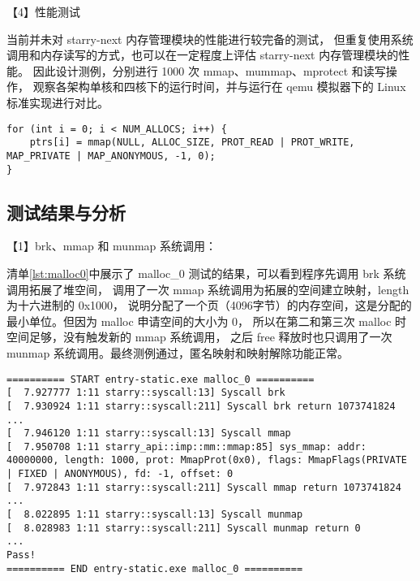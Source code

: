 【4】性能测试



当前并未对 starry-next 内存管理模块的性能进行较完备的测试，
但重复使用系统调用和内存读写的方式，也可以在一定程度上评估 starry-next 内存管理模块的性能。
因此设计测例，分别进行 1000 次 mmap、mummap、mprotect 和读写操作，
观察各架构单核和四核下的运行时间，并与运行在 qemu 模拟器下的 Linux 标准实现进行对比。

\begin{lstlisting}[caption=性能测试测例的部分代码]
for (int i = 0; i < NUM_ALLOCS; i++) {
    ptrs[i] = mmap(NULL, ALLOC_SIZE, PROT_READ | PROT_WRITE, MAP_PRIVATE | MAP_ANONYMOUS, -1, 0);
}
\end{lstlisting}

\subsection{测试结果与分析}

【1】brk、mmap 和 munmap 系统调用：

清单\ref{lst:malloc0}中展示了 malloc\_0 测试的结果，可以看到程序先调用 brk 系统调用拓展了堆空间，
调用了一次 mmap 系统调用为拓展的空间建立映射，length 为十六进制的 0x1000，
说明分配了一个页（4096字节）的内存空间，这是分配的最小单位。但因为 malloc 申请空间的大小为 0，
所以在第二和第三次 malloc 时空间足够，没有触发新的 mmap 系统调用，
之后 free 释放时也只调用了一次 munmap 系统调用。最终测例通过，匿名映射和映射解除功能正常。

\begin{lstlisting}[caption=运行 malloc\_0 测例的部分输出（info 级信息）, label=lst:malloc0]
========== START entry-static.exe malloc_0 ==========
[  7.927777 1:11 starry::syscall:13] Syscall brk
[  7.930924 1:11 starry::syscall:211] Syscall brk return 1073741824
...
[  7.946120 1:11 starry::syscall:13] Syscall mmap
[  7.950708 1:11 starry_api::imp::mm::mmap:85] sys_mmap: addr: 40000000, length: 1000, prot: MmapProt(0x0), flags: MmapFlags(PRIVATE | FIXED | ANONYMOUS), fd: -1, offset: 0
[  7.972843 1:11 starry::syscall:211] Syscall mmap return 1073741824
...
[  8.022895 1:11 starry::syscall:13] Syscall munmap
[  8.028983 1:11 starry::syscall:211] Syscall munmap return 0
...
Pass!
========== END entry-static.exe malloc_0 ==========
\end{lstlisting}

